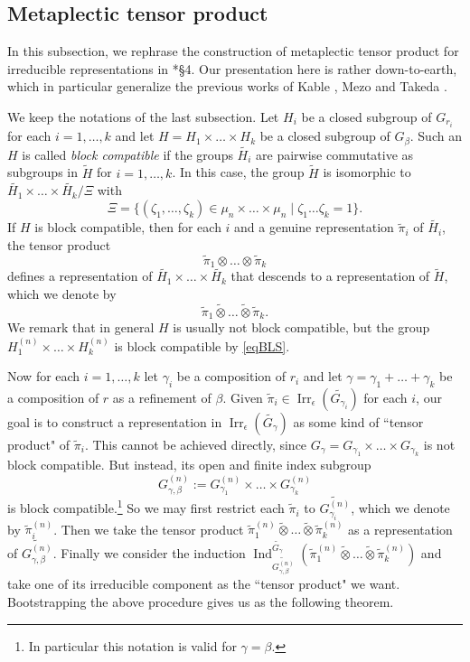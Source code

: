 \documentclass{amsart}
\numberwithin{equation}{section}
\newcommand{\mrirr}{\operatorname{Irr}}
\newcommand{\mrInd}{\operatorname{Ind}}
\newcommand{\wt}[1]{\widetilde{#1}}
\begin{document}
	\subsection{Metaplectic tensor product}\label{subsectionMTP}
	
	In this subsection, we rephrase the construction of metaplectic tensor product  for irreducible representations in \cite{kaplan2022classification}*{\S 4}. Our presentation here is rather down-to-earth, which in particular generalize the previous works of Kable \cite{kable2001tensor}, Mezo \cite{mezo2004metaplectic} and Takeda \cite{takeda2016metaplectic, takeda2017remarks}.
	
	
	We keep the notations of the last subsection. Let $H_{i}$ be a closed subgroup of $G_{r_{i}}$ for each $i=1,\dots,k$ and let $H=H_{1}\times\dots\times H_{k}$ be a closed subgroup of $G_{\beta}$.  Such an $H$ is called \emph{block compatible} if the groups $\wt{H_{i}}$ are pairwise commutative as subgroups in $\wt{H}$ for $i=1,\dots,k$. In this case, the group $\wt{H}$ is isomorphic to $\wt{H_{1}}\times\dots\times\wt{H_{k}}/\Xi$ with
	$$\Xi=\{(\zeta_{1},\dots,\zeta_{k})\in\mu_{n}\times\dots\times\mu_{n}\mid \zeta_{1}\dots\zeta_{k}=1\}.$$
	If $H$ is block compatible, then for each $i$ and a genuine representation $\wt{\pi}_{i}$ of $\wt{H_{i}}$, the tensor product
	$$\wt{\pi}_{1}\otimes\dots\otimes\wt{\pi}_{k}$$
	defines a representation of $\wt{H_{1}}\times\dots\times\wt{H_{k}}$ that descends to a representation of $\wt{H}$, which we denote by $$\wt{\pi}_{1}\wt{\otimes}\dots\wt{\otimes}\wt{\pi}_{k}.$$ 
	We remark that in general $H$ is usually not block compatible, but the group $H_{1}^{(n)}\times\dots\times H_{k}^{(n)}$ is block compatible by \eqref{eqBLS}. 
	
	Now for each $i=1,\dots,k$ let $\gamma_{i}$ be a composition of $r_{i}$ and let $\gamma=\gamma_{1}+\dots+\gamma_{k}$ be a composition of $r$ as a refinement of $\beta$. Given $\wt{\pi}_{i}\in\mrirr_{\epsilon}(\wt{G_{\gamma_{i}}})$ for each $i$, our goal is to construct a representation in $\mrirr_{\epsilon}(\wt{G_{\gamma}})$ as some kind of ``tensor product" of $\wt{\pi}_{i}$. This cannot be achieved directly, since $G_{\gamma}=G_{\gamma_{1}}\times\dots\times G_{\gamma_{k}}$ is not block compatible. But instead, its open and finite index subgroup 
	$$G_{\gamma,\beta}^{(n)}:=G_{\gamma_{1}}^{(n)}\times\dots\times G_{\gamma_{k}}^{(n)} $$
	is block compatible.\footnote{In particular this notation is valid for $\gamma=\beta$.} So we may first restrict each $\wt{\pi}_{i}$ to $\wt{G_{\gamma_{i}}^{(n)}}$, which we denote by $\wt{\pi}_{i}^{(n)}$. Then we take the tensor product
	$\wt{\pi}_{1}^{(n)}\wt{\otimes}\dots\wt{\otimes}\wt{\pi}_{k}^{(n)}$ as a representation of $\wt{G_{\gamma,\beta}^{(n)}}$. Finally we consider the induction $\mrInd_{\wt{G_{\gamma,\beta}^{(n)}}}^{\wt{G_{\gamma}}}(\wt{\pi}_{1}^{(n)}\wt{\otimes}\dots\wt{\otimes}\wt{\pi}_{k}^{(n)})$ and take one of its irreducible component as the ``tensor product" we want. Bootstrapping the above procedure gives us as the following theorem. 
	
\end{document}

